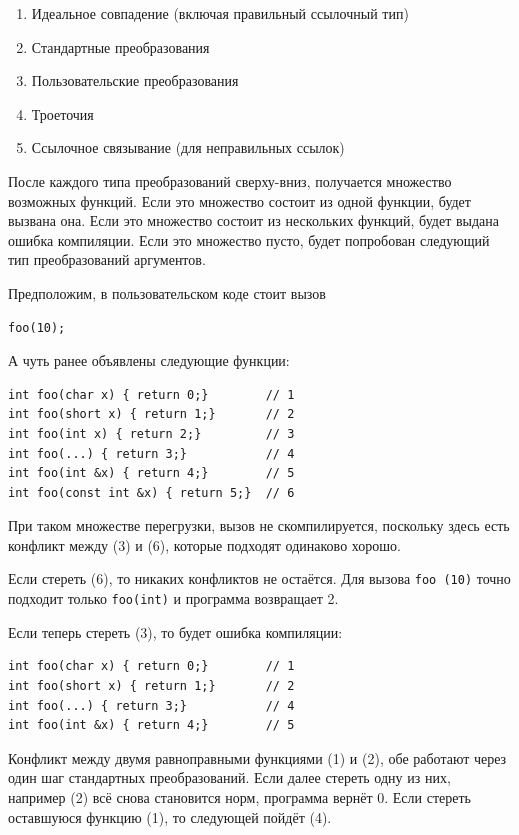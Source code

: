 \documentclass[a4paper,12pt,oneside]{book}
\begin{document}
\begin{enumerate}
\item Идеальное совпадение (включая правильный ссылочный тип)
\item Стандартные преобразования
\item Пользовательские преобразования
\item Троеточия
\item Ссылочное связывание (для неправильных ссылок)
\end{enumerate}

После каждого типа преобразований сверху-вниз, получается множество возможных функций. Если это множество состоит из одной функции, будет вызвана она. Если это множество состоит из нескольких функций, будет выдана ошибка компиляции. Если это множество пусто, будет попробован следующий тип преобразований аргументов.

Предположим, в пользовательском коде стоит вызов

\begin{lstlisting}
foo(10);
\end{lstlisting}

А чуть ранее объявлены следующие функции:

\begin{lstlisting}
int foo(char x) { return 0;}        // 1
int foo(short x) { return 1;}       // 2
int foo(int x) { return 2;}         // 3
int foo(...) { return 3;}           // 4
int foo(int &x) { return 4;}        // 5
int foo(const int &x) { return 5;}  // 6
\end{lstlisting}

При таком множестве перегрузки, вызов не скомпилируется, поскольку здесь есть конфликт между (3) и (6), которые подходят одинаково хорошо.

Если стереть (6), то никаких конфликтов не остаётся. Для вызова \lstinline!foo (10)! точно подходит только \lstinline!foo(int)! и программа возвращает 2.

Если теперь стереть (3), то будет ошибка компиляции:

\begin{lstlisting}
int foo(char x) { return 0;}        // 1
int foo(short x) { return 1;}       // 2
int foo(...) { return 3;}           // 4
int foo(int &x) { return 4;}        // 5
\end{lstlisting}

Конфликт между двумя равноправными функциями (1) и (2), обе работают через один шаг стандартных преобразований. Если далее стереть одну из них, например (2) всё снова становится норм, программа вернёт 0. Если стереть оставшуюся функцию (1), то следующей пойдёт (4).
\end{document}
